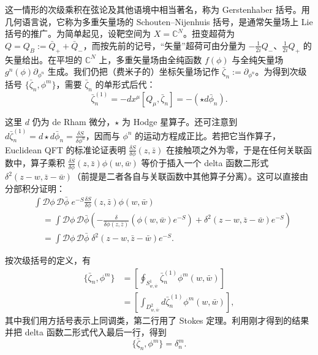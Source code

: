 这一情形的次级乘积在弦论及其他语境中相当著名，称为 Gerstenhaber 括号。用几何语言说，它称为多重矢量场的 Schouten--Nijenhuis 括号，是通常矢量场上 Lie 括号的推广。为简单起见，设靶空间为 $X=\mathbb{C}^N$。扭变超荷为 $Q = Q_B := \bar Q_+ + \bar Q_-$，而按先前的记号，“矢量”超荷可由分量为 $-\frac{1}{2i}Q_-$、$\frac{1}{2i}Q_+$ 的矢量给出。在平坦的 $\mathbb{C}^N$ 上，多重矢量场由全纯函数 $f(\phi)$ 与全纯矢量场 $g^n(\phi)\partial_{\phi^n}$ 生成。我们仍把（费米子的）坐标矢量场记作 $\bar\zeta_n := \partial_{\phi^n}$。为得到次级括号 $\{\bar\zeta_n,\phi^m\}$，需要 $\bar\zeta_n$ 的单形式后代：
\begin{equation}\tag{3.13}
\bar\zeta_n^{(1)} = -dx^\mu[Q_\mu,\bar\zeta_n] = -(\star d\bar\phi_n).
\end{equation}

这里 $d$ 仍为 de Rham 微分，$\star$ 为 Hodge 星算子。还可注意到 $d\bar\zeta_n^{(1)} = d\star d\bar\phi_n = \frac{\delta S}{\delta\phi^n}$，因而与 $\phi^n$ 的运动方程成正比。若把它当作算子，Euclidean QFT 的标准论证表明 $\frac{\delta S}{\delta\phi}(z,\bar z)$ 在接触项之外为零，于是在任何关联函数中，算子乘积 $\frac{\delta S}{\delta\phi}(z,\bar z)\phi(w,\bar w)$ 等价于插入一个 delta 函数二形式 $\delta^2(z-w,\bar z-\bar w)$（前提是二者各自与关联函数中其他算子分离）。这可以直接由分部积分证明：
\begin{equation}\tag{3.14}
\begin{aligned}
&\int \mathcal{D}\phi\,\mathcal{D}\bar\phi\; e^{-S}\frac{\delta S}{\delta\phi}(z,\bar z)\phi(w,\bar w)\\
&\quad = \int \mathcal{D}\phi\,\mathcal{D}\bar\phi \left( -\frac{\delta}{\delta\phi(z,\bar z)}\left( \phi(w,\bar w)e^{-S} \right) + \delta^2(z-w,\bar z-\bar w)e^{-S} \right)\\
&\quad = \int \mathcal{D}\phi\,\mathcal{D}\bar\phi\; \delta^2(z-w,\bar z-\bar w)e^{-S}.
\end{aligned}
\end{equation}

按次级括号的定义，有
\begin{equation}\tag{3.15}
\begin{aligned}
\{\bar\zeta_n,\phi^m\} &= \left[ \oint_{S^1_{w,\bar w}} \bar\zeta_n^{(1)} \phi^m(w,\bar w) \right]\\
&= \left[ \int_{D^2_{w,\bar w}} d\bar\zeta_n^{(1)} \phi^m(w,\bar w) \right],
\end{aligned}
\end{equation}
其中我们用方括号表示上同调类，第二行用了 Stokes 定理。利用刚才得到的结果并把 delta 函数二形式代入最后一行，得到
\begin{equation}\tag{3.16}
\{\bar\zeta_n,\phi^m\} = \delta_n^m .
\end{equation}

